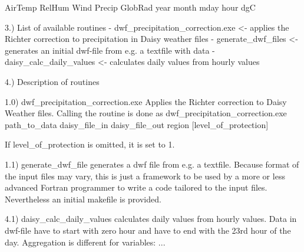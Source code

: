 AirTemp	RelHum	Wind	Precip	GlobRad
year	month	mday	hour	dgC	%


3.) List of available routines
- dwf_precipitation_correction.exe <- applies the Richter correction to precipitation in Daisy weather files
- generate_dwf_files <- generates an initial dwf-file from e.g. a textfile with data
- daisy_calc_daily_values  <- calculates daily values from hourly values


4.) Description of routines

1.0) dwf_precipitation_correction.exe
Applies the Richter correction to Daisy Weather files. Calling the routine is done as
dwf_precipitation_correction.exe path_to_data daisy_file_in daisy_file_out region [level_of_protection]

If level_of_protection is omitted, it is set to 1.



1.1) generate_dwf_file
generates a dwf file from e.g. a textfile. Because format of the input files may vary, this is just a framework to be used by a more or less advanced Fortran programmer to write a code tailored to the input files. Nevertheless an initial makefile is provided.

4.1) daisy_calc_daily_values
calculates daily values from hourly values. Data in dwf-file have to start with zero hour and have to end with the 23rd hour of the day.
Aggregation is different for variables: ... 

